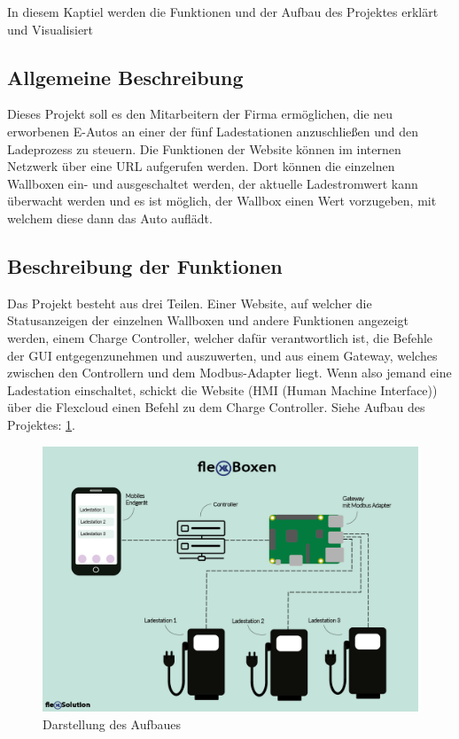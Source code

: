 In diesem Kaptiel werden die Funktionen und der Aufbau des Projektes erklärt und Visualisiert


\subsection{Allgemeine  Beschreibung}

Dieses Projekt soll es den Mitarbeitern der Firma ermöglichen, die neu erworbenen E-Autos an einer der fünf Ladestationen anzuschließen und den Ladeprozess zu steuern. Die Funktionen der Website können im internen Netzwerk über eine URL aufgerufen werden. Dort können die einzelnen Wallboxen ein- und ausgeschaltet werden, der aktuelle Ladestromwert kann überwacht werden und es ist möglich, der Wallbox einen Wert vorzugeben, mit welchem diese dann das Auto auflädt.

\subsection{Beschreibung der Funktionen}  \label{AufbauDesProjektesWallbox}
Das Projekt besteht aus drei Teilen. Einer Website, auf welcher die Statusanzeigen der einzelnen Wallboxen und andere Funktionen angezeigt werden, einem Charge Controller, welcher dafür verantwortlich ist, die Befehle der GUI entgegenzunehmen und auszuwerten, und aus einem Gateway, welches zwischen den Controllern und dem Modbus-Adapter liegt. Wenn also jemand eine Ladestation einschaltet, schickt die Website (HMI (Human Machine Interface)) über die Flexcloud einen Befehl zu dem Charge Controller.
Siehe Aufbau des Projektes: \ref{fig:impl:Infografik_FlexBoxen}.

\begin{figure}[h t]
  \centering
  \includegraphics[scale=0.7]{pics/Infografik_FlexBoxen2.png}
  \caption{Darstellung des Aufbaues}
  \label{fig:impl:Infografik_FlexBoxen}
\end{figure}

